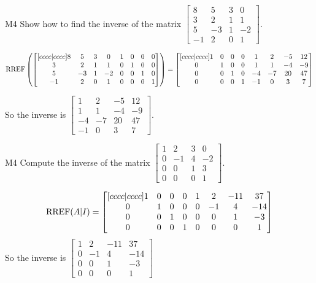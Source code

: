 \begin{problem}{M4}
Show how to find the inverse of the matrix $\begin{bmatrix} 8 & 5 & 3 & 0 \\ 3 & 2 & 1 & 1 \\ 5 & -3 & 1 & -2 \\ -1 & 2 & 0 & 1\end{bmatrix} $.
\end{problem}
\begin{solution}
$$\operatorname{RREF} \left(\begin{bmatrix}[cccc|cccc] 8 & 5 & 3 & 0 & 1 & 0 & 0 & 0\\ 3 & 2 & 1 & 1 & 0 & 1 & 0 & 0 \\ 5 & -3 & 1 & -2 & 0 & 0 & 1 & 0 \\ -1 & 2 & 0 & 1 & 0 & 0 & 0 & 1 \end{bmatrix} \right) = \begin{bmatrix}[cccc|cccc] 1 & 0 & 0 & 0 & 1 & 2 & -5 & 12 \\ 0 &  1 & 0 & 0 & 1 & 1 & -4 & -9 \\ 0 & 0 & 1 & 0 & -4 & -7 & 20 & 47 \\ 0 & 0 & 0 & 1 & -1 & 0 & 3 & 7 \end{bmatrix}$$

So the inverse is $\begin{bmatrix} 1 & 2 & -5 & 12 \\  1 & 1 & -4 & -9 \\  -4 & -7 & 20 & 47 \\-1 & 0 & 3 & 7 \end{bmatrix}$.
\end{solution}


\begin{problem}{M4}
Compute the inverse of the matrix $\begin{bmatrix} 1 & 2 & 3 & 0 \\ 0 & -1 & 4 & -2 \\ 0 & 0 & 1 & 3 \\ 0 & 0 & 0 & 1 \end{bmatrix}$.
\end{problem}
\begin{solution}
$$\operatorname{RREF}(A|I) = \begin{bmatrix}[cccc|cccc] 1 & 0 & 0 &0 & 1 & 2 & -11 & 37 \\ 0 & 1 & 0 & 0 & 0 & -1 & 4 & -14 \\ 0 & 0 & 1 & 0 & 0 & 0 & 1 & -3 \\ 0 & 0 & 0 & 1 & 0 & 0 & 0 & 1 \end{bmatrix}$$
So the inverse is $\begin{bmatrix}  1 & 2 & -11 & 37 \\ 0 & -1 & 4 & -14 \\  0 & 0 & 1 & -3 \\ 0 & 0 & 0 & 1 \end{bmatrix}$
\end{solution}


